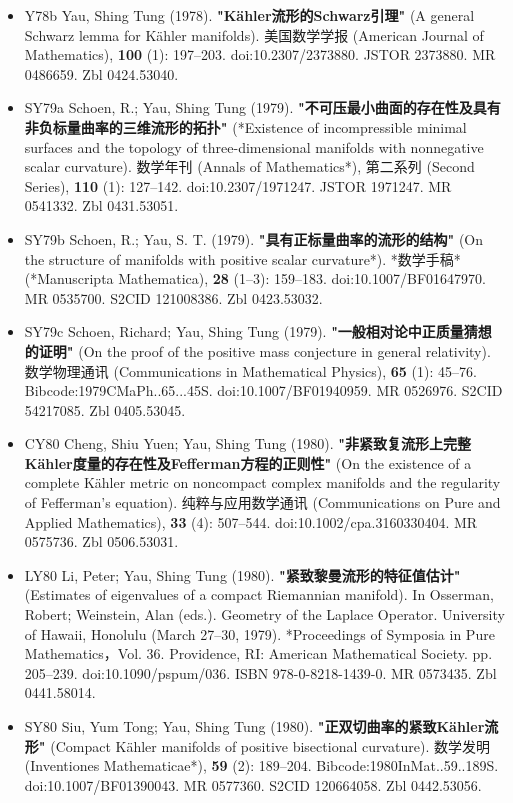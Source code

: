 \begin{itemize}
\item Y78b Yau, Shing Tung (1978). \textbf{"Kähler流形的Schwarz引理"} (A general Schwarz lemma for Kähler manifolds). 美国数学学报 (American Journal of Mathematics), \textbf{100} (1): 197–203. doi:10.2307/2373880. JSTOR 2373880. MR 0486659. Zbl 0424.53040.
\item SY79a  Schoen, R.; Yau, Shing Tung (1979). \textbf{"不可压最小曲面的存在性及具有非负标量曲率的三维流形的拓扑"} (*Existence of incompressible minimal surfaces and the topology of three-dimensional manifolds with nonnegative scalar curvature). 数学年刊 (Annals of Mathematics*), 第二系列 (Second Series), \textbf{110} (1): 127–142. doi:10.2307/1971247. JSTOR 1971247. MR 0541332. Zbl 0431.53051.
\item SY79b  Schoen, R.; Yau, S. T. (1979). \textbf{"具有正标量曲率的流形的结构"} (On the structure of manifolds with positive scalar curvature*). *数学手稿* (*Manuscripta Mathematica), \textbf{28} (1–3): 159–183. doi:10.1007/BF01647970. MR 0535700. S2CID 121008386. Zbl 0423.53032.
\item SY79c Schoen, Richard; Yau, Shing Tung (1979). \textbf{"一般相对论中正质量猜想的证明"} (On the proof of the positive mass conjecture in general relativity). 数学物理通讯 (Communications in Mathematical Physics), \textbf{65} (1): 45–76. Bibcode:1979CMaPh..65...45S. doi:10.1007/BF01940959. MR 0526976. S2CID 54217085. Zbl 0405.53045.
\item CY80 Cheng, Shiu Yuen; Yau, Shing Tung (1980). \textbf{"非紧致复流形上完整Kähler度量的存在性及Fefferman方程的正则性"} (On the existence of a complete Kähler metric on noncompact complex manifolds and the regularity of Fefferman's equation). 纯粹与应用数学通讯 (Communications on Pure and Applied Mathematics), \textbf{33} (4): 507–544. doi:10.1002/cpa.3160330404. MR 0575736. Zbl 0506.53031.
\item LY80 Li, Peter; Yau, Shing Tung (1980). \textbf{"紧致黎曼流形的特征值估计"} (Estimates of eigenvalues of a compact Riemannian manifold). In Osserman, Robert; Weinstein, Alan (eds.). Geometry of the Laplace Operator. University of Hawaii, Honolulu (March 27–30, 1979). *Proceedings of Symposia in Pure Mathematics，Vol. 36. Providence, RI: American Mathematical Society. pp. 205–239. doi:10.1090/pspum/036. ISBN 978-0-8218-1439-0. MR 0573435. Zbl 0441.58014.
\item SY80 Siu, Yum Tong; Yau, Shing Tung (1980). \textbf{"正双切曲率的紧致Kähler流形"} (Compact Kähler manifolds of positive bisectional curvature). 数学发明 (Inventiones Mathematicae*), \textbf{59} (2): 189–204. Bibcode:1980InMat..59..189S. doi:10.1007/BF01390043. MR 0577360. S2CID 120664058. Zbl 0442.53056.

\end{itemize}
